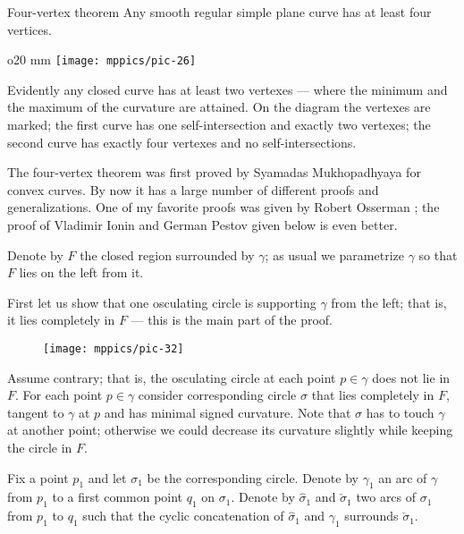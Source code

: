 \begin{thm}{Four-vertex theorem}\label{thm:4-vert}
Any smooth regular simple plane curve has at least four
vertices.
\end{thm}

\begin{wrapfigure}{o}{20 mm}
\vskip-4mm
\centering
\texttt{[image: mppics/pic-26]}
\vskip0mm
\end{wrapfigure}

Evidently any closed curve has at least two vertexes --- where the minimum and the maximum of the curvature are attained.
On the diagram the vertexes are marked;
the first curve has one self-intersection and exactly two vertexes;
the second curve has exactly four vertexes and no self-intersections.

The four-vertex theorem was first proved by Syamadas Mukhopadhyaya \cite{mukhopadhyaya} for convex curves.
By now it has a large number of different proofs and generalizations.
One of my favorite proofs was given by Robert Osserman \cite{osserman};
the proof of Vladimir Ionin and German Pestov given below is even better.

Denote by $F$ the closed region surrounded by $\gamma$;
as usual we parametrize $\gamma$ so that $F$ lies on the left from it.

First let us show that one osculating circle is supporting $\gamma$ from the left; that is, it lies completely in $F$ --- this is the main part of the proof.

\begin{figure}[h!]%
\vskip-0mm
\centering
\texttt{[image: mppics/pic-32]}
\vskip0mm
\end{figure}

Assume contrary; that is, the osculating circle at each point $p\in \gamma$ does not lie in $F$.
For each point $p\in\gamma$ consider corresponding circle $\sigma$ that lies completely in $F$, tangent to $\gamma$ at $p$ and has minimal signed curvature.
Note that $\sigma$ has to touch $\gamma$ at another point;
otherwise we could decrease its curvature slightly while keeping the circle in $F$.


Fix a point $p_1$ and let $\sigma_1$ be the corresponding circle.
Denote by $\gamma_1$ an arc of $\gamma$ from $p_1$ to a first common point $q_1$ on $\sigma_1$.
Denote by $\hat\sigma_1$ and $\check\sigma_1$ two arcs of $\sigma_1$ from $p_1$ to $q_1$ such that the cyclic concatenation of $\hat\sigma_1$ and $\gamma_1$ surrounds $\check\sigma_1$.

